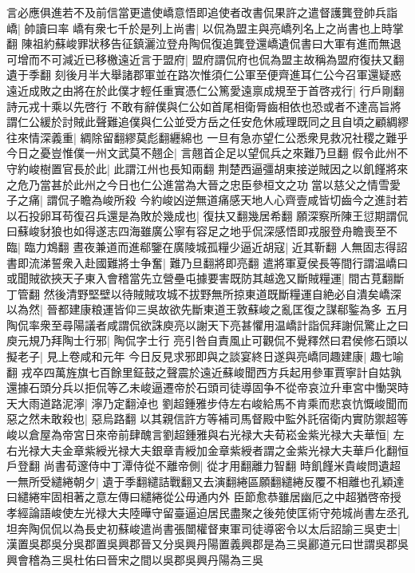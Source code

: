 言必應俱進若不及前信當更遣使嶠意悟即追使者改書侃果許之遣督護龔登帥兵詣嶠|{
	帥讀曰率}
嶠有衆七千於是列上尚書|{
	以侃為盟主與亮嶠列名上之尚書也上時掌翻}
陳祖約蘇峻罪狀移告征鎮灑泣登舟陶侃復追龔登還嶠遺侃書曰大軍有進而無退可增而不可減近已移檄遠近言于盟府|{
	盟府謂侃府也侃為盟主故稱為盟府復扶又翻遺于季翻}
刻後月半大舉諸郡軍並在路次惟須仁公軍至便齊進耳仁公今召軍還疑惑遠近成敗之由將在於此僕才輕任重實憑仁公篤愛遠禀成規至于首啓戎行|{
	行戶剛翻詩元戎十乘以先啓行}
不敢有辭僕與仁公如首尾相衛脣齒相依也恐或者不達高旨將謂仁公緩於討賊此聲難追僕與仁公並受方岳之任安危休戚理既同之且自頃之顧綢繆往來情深義重|{
	綢除留翻繆莫彪翻纒綿也}
一旦有急亦望仁公悉衆見救况社稷之難乎今日之憂豈惟僕一州文武莫不翹企|{
	言翹首企足以望侃兵之來難乃旦翻}
假令此州不守約峻樹置官長於此|{
	此謂江州也長知兩翻}
荆楚西逼彊胡東接逆賊因之以飢饉將來之危乃當甚於此州之今日也仁公進當為大晉之忠臣參桓文之功當以慈父之情雪愛子之痛|{
	謂侃子瞻為峻所殺}
今約峻凶逆無道痛感天地人心齊壹咸皆切齒今之進討若以石投卵耳苟復召兵還是為敗於幾成也|{
	復扶又翻幾居希翻}
願深察所陳王愆期謂侃曰蘇峻豺狼也如得遂志四海雖廣公寧有容足之地乎侃深感悟即戎服登舟瞻喪至不臨|{
	臨力鴆翻}
晝夜兼道而進郗鑒在廣陵城孤糧少逼近胡寇|{
	近其靳翻}
人無固志得詔書即流涕誓衆入赴國難將士争奮|{
	難乃旦翻將即亮翻}
遣將軍夏侯長等間行謂温嶠曰或聞賊欲挾天子東入會稽當先立營壘屯據要害既防其越逸又斷賊糧運|{
	間古莧翻斷丁管翻}
然後清野堅壁以待賊賊攻城不拔野無所掠東道既斷糧運自絶必自潰矣嶠深以為然|{
	晉都建康粮運皆仰三吳故欲先斷東道王敦蘇峻之亂匡復之謀郗鍳為多}
五月陶侃率衆至尋陽議者咸謂侃欲誅庾亮以謝天下亮甚懼用温嶠計詣侃拜謝侃驚止之曰庾元規乃拜陶士行邪|{
	陶侃字士行}
亮引咎自責風止可觀侃不覺釋然曰君侯修石頭以擬老子|{
	見上卷咸和元年}
今日反見求邪即與之談宴終日遂與亮嶠同趣建康|{
	趣七喻翻}
戎卒四萬旌旗七百餘里鉦鼓之聲震於遠近蘇峻聞西方兵起用參軍賈寧計自姑孰還據石頭分兵以拒侃等乙未峻逼遷帝於石頭司徒導固争不從帝哀泣升車宮中慟哭時天大雨道路泥濘|{
	濘乃定翻淖也}
劉超鍾雅步侍左右峻給馬不肯乘而悲哀忼慨峻聞而惡之然未敢殺也|{
	惡烏路翻}
以其親信許方等補司馬督殿中監外託宿衛内實防禦超等峻以倉屋為帝宮日來帝前肆醜言劉超鍾雅與右光禄大夫荀崧金紫光禄大夫華恒|{
	左右光禄大夫金章紫綬光禄大夫銀章青綬加金章紫綬者謂之金紫光禄大夫華戶化翻恒戶登翻}
尚書荀邃侍中丁潭侍從不離帝側|{
	從才用翻離力智翻}
時飢饉米貴峻問遺超一無所受繾綣朝夕|{
	遺于季翻繾詰戰翻又去演翻綣區願翻繾綣反覆不相離也孔穎達曰繾綣牢固相著之意左傳曰繾綣從公毋通内外}
臣節愈恭雖居幽厄之中超猶啓帝授孝經論語峻使左光禄大夫陸曄守留臺逼迫居民盡聚之後苑使匡術守苑城尚書左丞孔坦奔陶侃侃以為長史初蘇峻遣尚書張闓權督東軍司徒導密令以太后詔諭三吳吏士|{
	漢置吳郡吳分吳郡置吳興郡晉又分吳興丹陽置義興郡是為三吳酈道元曰世謂吳郡吳興會稽為三吳杜佑曰晉宋之間以吳郡吳興丹陽為三吳}
